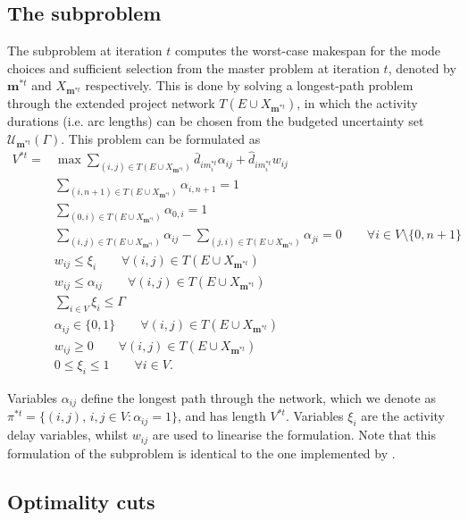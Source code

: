 \documentclass[a4paper,abstracton]{scrartcl}
\newcommand{\U}{{\mathcal{U}}}
\begin{document}
\subsection{The subproblem}
 
The subproblem at iteration $t$ computes the worst-case makespan for the mode choices and sufficient selection from the master problem at iteration $t$, denoted by $\bm{m}^{*t}$ and $X_{\bm{m}^{*t}}$ respectively. This is done by solving a longest-path problem through the extended project network $T(E\cup X_{\bm{m}^{*t}})$, in which the activity durations (i.e. arc lengths) can be chosen from the budgeted uncertainty set $\U_{\bm{m}^{*t}}(\Gamma)$. This problem can be formulated as 
\begin{align}
	V^{*t} = &\max \sum_{(i,j)\in T(E\cup X_{\bm{m}^{*t}})} \bar{d}_{im^{*t}_i}\alpha_{ij} + \hat{d}_{im^{*t}_i}w_{ij}\label{eqn:subproblem_first}\\
	& \sum_{(i,n+1)\in T(E\cup X_{\bm{m}^{*t}})} \alpha_{i,n+1} = 1\\
	& \sum_{(0,i)\in T(E\cup X_{\bm{m}^{*t}})} \alpha_{0,i} = 1\\
	& \sum_{(i,j)\in T(E\cup X_{\bm{m}^{*t}})} \alpha_{ij} - \sum_{(j,i)\in T(E\cup X_{\bm{m}^{*t}})} \alpha_{ji} = 0 \qquad \forall i \in V\setminus\{0,n+1\}\\
	& w_{ij} \leq \xi_i \qquad \forall (i,j)\in T(E\cup X_{\bm{m}^{*t}})\\
	& w_{ij} \leq \alpha_{ij} \qquad \forall (i,j)\in T(E\cup X_{\bm{m}^{*t}})\\
	& \sum_{i\in V}\xi_i \leq \Gamma\\
	& \alpha_{ij}\in \{0,1\} \qquad \forall (i,j)\in T(E\cup X_{\bm{m}^{*t}})\\
	& w_{ij}\geq 0 \qquad \forall (i,j)\in T(E\cup X_{\bm{m}^{*t}})\\
	& 0\leq \xi_i \leq 1 \qquad \forall i\in V. \label{eqn:subproblem_last}
\end{align}

Variables $\alpha_{ij}$ define the longest path through the network, which we denote as $\pi^{*t}=\{(i,j),\,i,j\in V:\alpha_{ij}=1\}$, and has length $V^{*t}$. Variables $\xi_i$ are the activity delay variables, whilst $w_{ij}$ are used to linearise the formulation. Note that this formulation of the subproblem is identical to the one implemented by \cite{balouka2021robust}.

\subsection{Optimality cuts} \label{section:optimality_cuts}
\end{document}
